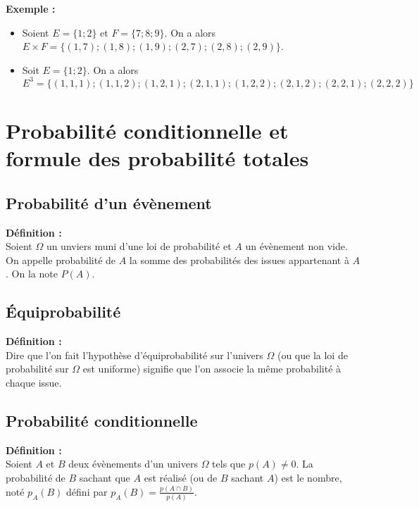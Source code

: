 \documentclass{article}
\begin{document}
\textbf{Exemple :}
\begin{itemize}
  \item Soient $E=\{1;2\}$ et $F=\{ 7;8;9 \}$. On a alors $E\times F = \{ (1,7) ; (1,8) ; (1,9) ; (2,7) ; (2,8) ; (2,9) \}$.
  \item Soit $E=\{1;2\}$. On a alors $E^3 = \{  (1,1,1) ; (1,1,2) ; (1,2,1) ; (2,1,1) ; (1,2,2) ; (2,1,2) ; (2,2,1) ; (2,2,2)  \}$
\end{itemize}

\section{Probabilité conditionnelle et formule des probabilité totales}

\subsection{Probabilité d'un évènement}

\begin{mdframed}[style=definitionStyle]
    \textbf{Définition :} ~\\
    Soient $\Omega$ un unviers muni d'une loi de probabilité et $A$ un évènement non vide.\\
    On appelle probabilité de $A$ la somme des probabilités des issues appartenant à $A$. On la note $P(A)$.
\end{mdframed}

\subsection{Équiprobabilité}

\begin{mdframed}[style=definitionStyle]
    \textbf{Définition :} ~\\
    Dire que l'on fait l'hypothèse d'équiprobabilité sur l'univers $\Omega$ (ou que la loi de probabilité sur $\Omega$
    est uniforme) signifie que l'on associe la même probabilité à chaque issue.
\end{mdframed}

\subsection{Probabilité conditionnelle}

\begin{mdframed}[style=definitionStyle]
  \textbf{Définition :} ~\\
  Soient $A$ et $B$ deux évènements d'un univers $\Omega$ tels que $p(A)\not= 0$.
  La probabilité de $B$ sachant que $A$ est réalisé (ou de $B$ sachant $A$) est le nombre, noté $p_A(B)$ défini par $\displaystyle{}p_A(B)=\frac{p(A\cap B)}{p(A)}$.
\end{mdframed}
\end{document}

